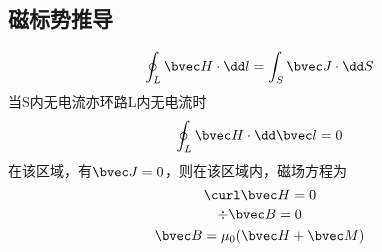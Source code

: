 
\subsection{磁标势推导}
\begin{equation}
\oint_L \bvec H \cdot \dd  l = \int_S \bvec J \cdot \dd S

\end{equation}当S内无电流亦环路L内无电流时
\begin{equation}
\oint_ L\bvec H \cdot \dd \bvec l = 0
\end{equation}
在该区域，有$\bvec J=0$，则在该区域内，磁场方程为 
\begin{equation}
\curl \bvec H =0
\end{equation}
\begin{equation}
\div \bvec B=0
\end{equation}
\begin{equation}
\bvec B=\mu_0(\bvec H+\bvec M)
\end{equation}


